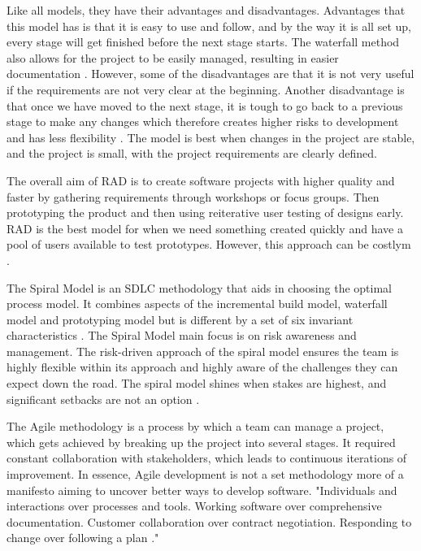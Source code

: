 Like all models, they have their advantages and disadvantages. Advantages that this model has is that it is easy to use and follow, and by the way it is all set up, every stage will get finished before the next stage starts. The waterfall method also allows for the project to be easily managed, resulting in easier documentation \cite{cscm01slidesl5}. However, some of the disadvantages are that it is not very useful if the requirements are not very clear at the beginning. Another disadvantage is that once we have moved to the next stage, it is tough to go back to a previous stage to make any changes which therefore creates higher risks to development and has less flexibility \cite{cscm01slidesl5}. The model is best when changes in the project are stable, and the project is small, with the project requirements are clearly defined.

The overall aim of RAD is to create software projects with higher quality and faster by gathering requirements through workshops or focus groups. Then prototyping the product and then using reiterative user testing of designs early. RAD is the best model for when we need something created quickly and have a pool of users available to test prototypes. However, this approach can be costlym \cite{cscm01slides}. 

The Spiral Model is an SDLC methodology that aids in choosing the optimal process model. It combines aspects of the incremental build model, waterfall model and prototyping model but is different by a set of six invariant characteristics \cite{spiralmodel}. The Spiral Model main focus is on risk awareness and management. The risk-driven approach of the spiral model ensures the team is highly flexible within its approach and highly aware of the challenges they can expect down the road. The spiral model shines when stakes are highest, and significant setbacks are not an option \cite{spiralmodel}.


The Agile methodology is a process by which a team can manage a project, which gets achieved by breaking up the project into several stages. It required constant collaboration with stakeholders, which leads to continuous iterations of improvement. In essence, Agile development is not a set methodology more of a manifesto aiming to uncover better ways to develop software. "Individuals and interactions over processes and tools. Working software over comprehensive documentation. Customer collaboration over contract negotiation. Responding to change over following a plan \cite{agilemanifesto}."

